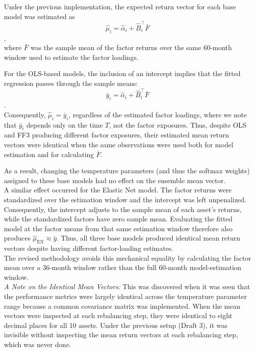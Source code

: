 \documentclass{article}
\begin{document}
Under the previous implementation, the expected return vector for each base model was estimated as
\[ \hat{\mu}_i = \hat{\alpha}_i +\hat{B}_i^{\top}\bar{F} \],\\

where $\bar{F}$ was the sample mean of the factor returns over the same 60-month window used to estimate the factor loadings.

For the OLS-based models, the inclusion of an intercept implies that the fitted regression passes through the sample means:
\[\bar{y}_i=\hat{\alpha}_i +\hat{B}_i^{\top}\bar{F}\] .\\
Consequently,
$\hat{\mu}_i=\bar{y}_i$,
regardless of the estimated factor loadings, where we note that $\bar{y}_i$ depends only on the time $T$, not the factor exposures. Thus, despite OLS and FF3 producing different factor exposures, their estimated mean return vectors were identical when the same observations were used both for model estimation and for calculating $\bar{F}$.

As a result, changing the temperature parameters (and thus the softmax weights) assigned to these base models had no effect on the ensemble mean vector. \\

A similar effect occurred for the Elastic Net model. The factor returns were standardized over the estimation window and the intercept was left unpenalized. Consequently, the intercept adjusts to the sample mean of each asset's returns, while the standardized factors have zero sample mean. Evaluating the fitted model at the factor means from that same estimation window therefore also produces $\hat{\mu}_{\text{EN}} \approx \bar{y}$. Thus, all three base models produced identical mean return vectors despite having different factor-loading estimates.\\

The revised methodology avoids this mechanical equality by calculating the factor mean over a 36-month window rather than the full 60-month model-estimation window.\\

\emph{A Note on the Identical Mean Vectors:} This was discovered when it was seen that the performance metrics were largely identical across the temperature parameter range because a common covariance matrix was implemented. When the mean vectors were inspected at each rebalancing step, they were identical to eight decimal places for all 10 assets. Under the previous setup (Draft 3), it was invisible without inspecting the mean return vectors at each rebalancing step, which was never done.\\
\end{document}

